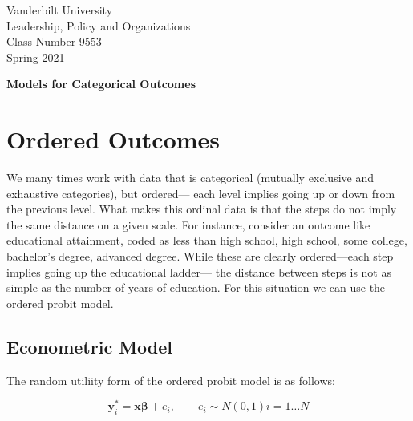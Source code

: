 \documentclass[12 pt]{article}
\begin{document}
\newcommand{\boldbeta}{\boldsymbol{\beta}}
\newcommand{\boldy}{\boldsymbol{y}}
\newcommand{\boldX}{\boldsymbol{X}}
\newcommand{\boldx}{\boldsymbol{x}}
\newcommand{\boldz}{\boldsymbol{z}}
\newcommand{\boldgamma}{\boldsymbol{\gamma}}
\newcommand{\boldeps}{\boldsymbol{\epsilon}}


\setlength{\parskip}{1ex plus 0.5ex minus 0.2ex}

\setcounter{secnumdepth}{-2}


\begin{flushleft}
  

Vanderbilt University \\
Leadership, Policy and Organizations \\
Class Number 9553 \\
Spring 2021 \\
\end{flushleft}

\begin{centering}
\textbf{\large{Models for Categorical Outcomes}}  
\end{centering}


\section{Ordered Outcomes}

We many times work with data that is categorical (mutually exclusive and exhaustive
categories), but ordered--- each level implies going up or down from the previous level.
What makes this ordinal data is that the steps do not imply the same distance on a
given scale. For instance, consider an outcome like educational attainment, coded as
less than high school, high school, some college, bachelor's degree, advanced degree.
While these are clearly ordered---each step implies going up the educational ladder---
the distance between steps is not as simple as the number of years of education.
For this situation we can use the ordered probit model. 


\subsection{Econometric Model}
\label{sec:econometric-model}

The random  utiliity form of the ordered probit model is as follows:

\begin{equation*}
  \boldy^*_i=\boldx \boldbeta + e_i, \qquad e_i  \sim N (0,1)   i=1  \ldots N
\end{equation*}
\end{document}

